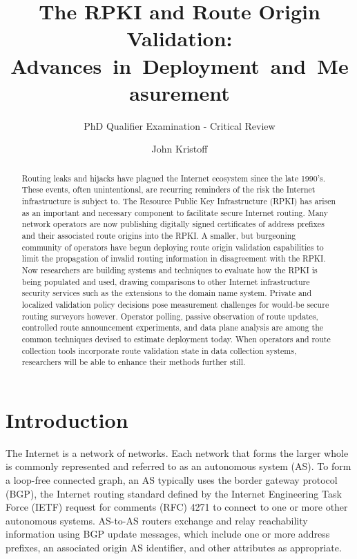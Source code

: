 \documentclass[sigconf]{acmart}
\begin{document}
\title{The RPKI and Route Origin Validation: Advances~in~Deployment~and~Measurement}
\subtitle{PhD Qualifier Examination - Critical Review}
\author{John Kristoff}

\begin{abstract}

Routing leaks and hijacks have plagued the Internet ecosystem since the
late 1990's.  These events, often unintentional, are recurring reminders
of the risk the Internet infrastructure is subject to.  The Resource
Public Key Infrastructure (RPKI) has arisen as an important and
necessary component to facilitate secure Internet routing.  Many network
operators are now publishing digitally signed certificates of address
prefixes and their associated route origins into the RPKI.  A smaller,
but burgeoning community of operators have begun deploying route origin
validation capabilities to limit the propagation of invalid routing
information in disagreement with the RPKI.  Now researchers are building
systems and techniques to evaluate how the RPKI is being populated and
used, drawing comparisons to other Internet infrastructure security
services such as the extensions to the domain name system.  Private and
localized validation policy decisions pose measurement challenges for
would-be secure routing surveyors however.  Operator polling, passive
observation of route updates, controlled route announcement experiments,
and data plane analysis are among the common techniques devised to
estimate deployment today.  When operators and route collection tools
incorporate route validation state in data collection systems,
researchers will be able to enhance their methods further still.

\end{abstract}

\maketitle

\section{Introduction}\label{sec:Introduction}

The Internet is a network of networks.  Each network that forms the
larger whole is commonly represented and referred to as an autonomous
system (AS).  To form a loop-free connected graph, an AS typically uses
the border gateway protocol (BGP), the Internet routing standard defined
by the Internet Engineering Task Force (IETF) request for comments (RFC)
4271 to connect to one or more other autonomous
systems.\cite{rekhter_border_2006}  AS-to-AS routers exchange and relay
reachability information using BGP update messages, which include one or
more address prefixes, an associated origin AS identifier, and other
attributes as appropriate.
\end{document}
